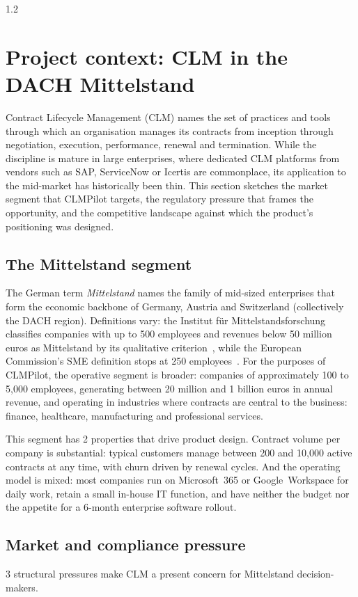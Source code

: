 \begin{spacing}{1.2}
\section{Project context: CLM in the DACH Mittelstand}

Contract Lifecycle Management (CLM) names the set of practices and tools
through which an organisation manages its contracts from inception through
negotiation, execution, performance, renewal and termination. While the
discipline is mature in large enterprises, where dedicated CLM platforms
from vendors such as SAP, ServiceNow or Icertis are commonplace, its
application to the mid-market has historically been thin. This section
sketches the market segment that CLMPilot targets, the regulatory pressure
that frames the opportunity, and the competitive landscape against which
the product's positioning was designed.

\subsection{The Mittelstand segment}
The German term \textit{Mittelstand} names the family of mid-sized
enterprises that form the economic backbone of Germany, Austria and
Switzerland (collectively the DACH region). Definitions vary: the
Institut für Mittelstandsforschung classifies companies with up to 500
employees and revenues below 50 million euros as Mittelstand by its
qualitative criterion~\cite{IfMBonn}, while the European Commission's SME
definition stops at 250 employees~\cite{EUSMEDefinition}. For the
purposes of CLMPilot, the operative segment
is broader: companies of approximately 100 to 5{,}000 employees, generating
between 20 million and 1 billion euros in annual revenue, and operating in
industries where contracts are central to the business: finance,
healthcare, manufacturing and professional services.

This segment has 2 properties that drive product design. Contract volume
per company is substantial: typical customers manage between 200 and
10{,}000 active contracts at any time, with churn driven by renewal cycles.
And the operating model is mixed: most companies run on Microsoft~365 or
Google~Workspace for daily work, retain a small in-house IT function, and
have neither the budget nor the appetite for a 6-month enterprise
software rollout.

\subsection{Market and compliance pressure}
3 structural pressures make CLM a present concern for Mittelstand
decision-makers.


\end{spacing}
